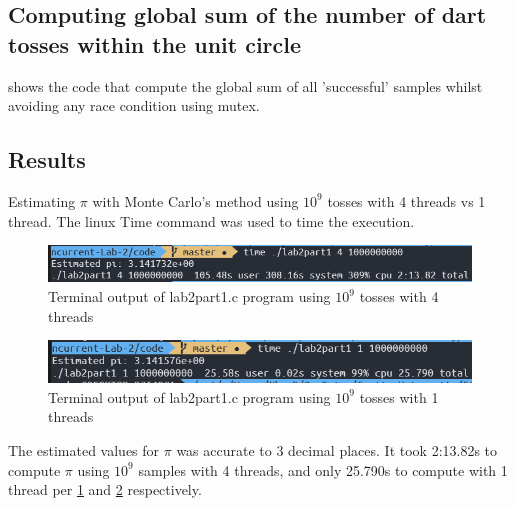 
\subsection{Computing global sum of the number of dart tosses within the unit circle}

 shows the code that compute the global sum of all 'successful'
samples whilst avoiding any race condition using mutex.

\vspace{0.5cm}



\subsection{Results}

Estimating $\pi$ with Monte Carlo's method using $10^9$ tosses with 4 threads vs 1 thread. The linux Time
command was used to time the execution.

\begin{figure}[ht]
	\centering
	\includegraphics[width=\textwidth]{Figures/part1_4_10e9.PNG}
	\caption{Terminal output of lab2part1.c program using $10^9$ tosses with 4 threads}
	\label{fig:part1_4_10e9}
\end{figure}

\begin{figure}[ht]
	\centering
	\includegraphics[width=\textwidth]{Figures/part1_1_10e9.PNG}
	\caption{Terminal output of lab2part1.c program using $10^9$ tosses with 1 threads}
	\label{fig:part1_1_10e9}
\end{figure}

The estimated values for $\pi$ was accurate to 3 decimal places. It took 2:13.82s to compute $\pi$ using
$10^9$ samples with 4 threads, and only 25.790s to compute with 1 thread per \cref{fig:part1_4_10e9} 
and \cref{fig:part1_1_10e9} respectively. 